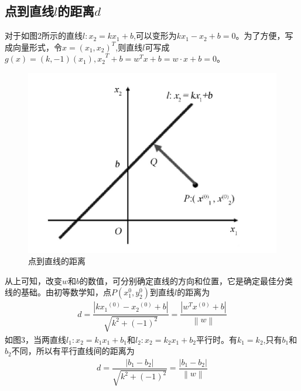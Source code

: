 \documentclass[12pt,a4paper]{article}%
\begin{document}
	\subsection{点到直线$l$的距离$d$}
	对于如图2所示的直线$l:{x}_{2}=k{x}_{1}+b$,可以变形为$k{x}_{1}-{x}_{2}+b=0$。为了方便，写成向量形式，令$x={({x}_{1},{x}_{2})}^{T}$,则直线$l$可写成$g(x)=(k,-1){({x}_{1}),{x}_{2}}^{T}+b={w}^{T}x+b=w·x+b=0$。
	
	\begin{figure}[H]%
		\centering
		\begin{minipage}{0.6\textwidth}%
			\centering
			\includegraphics[width=0.8%
			\textwidth]{figure3}%
			\caption{\fontsize{10pt}{15pt}\selectfont 点到直线的距离}%
		\end{minipage}
	\end{figure}
	从上可知，改变$w$和$b$的数值，可分别确定直线的方向和位置，它是确定最佳分类线的基础。由初等数学知，点$P({{x}_{1}^{0}},{{y}_{2}^{0}})$到直线$l$的距离为
	\begin{align}
		d=\dfrac{\left|k{{x}_{1}}^{(0)}-{{x}_{2}}^{(0)}+b\right|}{ \sqrt{{k}^{2}+{(-1)}^{2}}}=\dfrac{\left|{w}^{T}{x}^{(0)}+b \right|}{\left\|w\right\|}
	\end{align}
	如图3，当两直线${l}_{1}:{x}_{2}={k}_{1}{x}_{1}+{b}_{1}$和${l}_{2}:{x}_{2}={k}_{2}{x}_{1}+{b}_{2}$平行时。有${k}_{1}={k}_{2}$,只有${b}_{1}$和${b}_{2}$不同，所以有平行直线间的距离为
	\begin{align}
		d=\dfrac{\left|{b}_{1}-{b}_{2}\right|}{\sqrt{{k}^{2}+{(-1)}^{2}}}=\dfrac{\left|{b}_{1}-{b}_{2}\right|}{\left\|w\right\|}
	\end{align}
\end{document}
